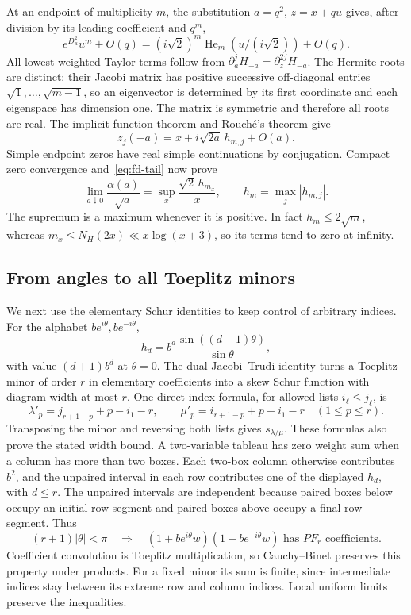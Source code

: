 At an endpoint of multiplicity $m$, the substitution
$a=q^2$, $z=x+qu$ gives, after division by its leading coefficient
and $q^m$,
\[
 e^{D_u^2}u^m+O(q)
   =(i\sqrt2)^m\operatorname{He}_m(u/(i\sqrt2))+O(q).
\]
All lowest weighted Taylor terms follow from
$\partial_a^jH_{-a}=\partial_z^{2j}H_{-a}$.
The Hermite roots are distinct: their Jacobi matrix has positive
successive off-diagonal entries $\sqrt1,\ldots,\sqrt{m-1}$, so an
eigenvector is determined by its first coordinate and each eigenspace
has dimension one.  The matrix is symmetric and therefore all roots
are real.  The implicit function theorem and Rouch\'e's theorem give
\begin{equation}\label{eq:fd-localheat}
 z_j(-a)=x+i\sqrt{2a}\,h_{m,j}+O(a).
\end{equation}
Simple endpoint zeros have real simple continuations by conjugation.
Compact zero convergence and~\eqref{eq:fd-tail} now prove
\begin{equation}\label{eq:fd-anglelimit}
 \lim_{a\downarrow0}\frac{\alpha(a)}{\sqrt a}
   =\sup_x\frac{\sqrt2\,h_{m_x}}x,
 \qquad h_m=\max_j|h_{m,j}|.
\end{equation}
The supremum is a maximum whenever it is positive.  In fact
$h_m\le2\sqrt m$, whereas $m_x\le N_H(2x)\ll x\log(x+3)$,
so its terms tend to zero at infinity.

\subsection{From angles to all Toeplitz minors}

We next use the elementary Schur identities to keep control of arbitrary indices.
For the alphabet $be^{i\theta},be^{-i\theta}$,
\[
 h_d=b^d\frac{\sin((d+1)\theta)}{\sin\theta},
\]
with value $(d+1)b^d$ at $\theta=0$.  The dual Jacobi--Trudi identity
turns a Toeplitz minor of order $r$ in elementary coefficients into
a skew Schur function with diagram width at most $r$.
One direct index formula, for allowed lists $i_\ell\le j_\ell$, is
\[
 \lambda'_p=j_{r+1-p}+p-i_1-r,\qquad
 \mu'_p=i_{r+1-p}+p-i_1-r\quad(1\le p\le r).
\]
Transposing the minor and reversing both lists gives
$s_{\lambda/\mu}$.  These formulas also prove the stated width bound.
A two-variable tableau has zero weight sum when a column has more
than two boxes.  Each two-box column otherwise contributes $b^2$,
and the unpaired interval in each row contributes one of the displayed
$h_d$, with $d\le r$.  The unpaired intervals are independent because
paired boxes below occupy an initial row segment and paired boxes above
occupy a final row segment.  Thus
\begin{equation}\label{eq:fd-sector}
 (r+1)|\theta|<\pi
 \quad\Longrightarrow\quad
 (1+be^{i\theta}w)(1+be^{-i\theta}w)\text{ has }PF_r\text{ coefficients}.
\end{equation}
Coefficient convolution is Toeplitz multiplication, so Cauchy--Binet
preserves this property under products.  For a fixed minor its sum
is finite, since intermediate indices stay between its extreme row
and column indices.  Local uniform limits preserve the inequalities.

